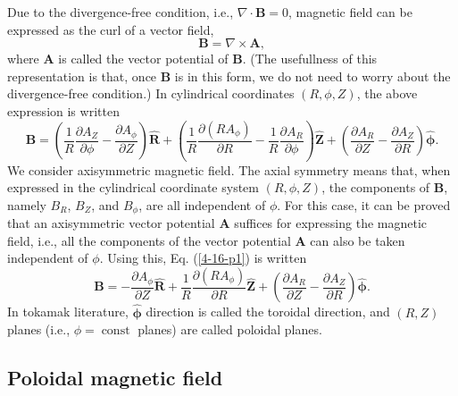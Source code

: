\documentclass{llncs}
\newcommand{\tmmathbf}[1]{\ensuremath{\boldsymbol{#1}}}
\newcommand{\tmop}[1]{\ensuremath{\operatorname{#1}}}
\begin{document}
Due to the divergence-free condition, i.e., $\nabla \cdot \mathbf{B}= 0$,
magnetic field can be expressed as the curl of a vector field,
\begin{equation}
  \mathbf{B}= \nabla \times \mathbf{A},
\end{equation}
where $\mathbf{A}$ is called the vector potential of $\mathbf{B}$. (The
usefullness of this representation is that, once $\mathbf{B}$ is in this form,
we do not need to worry about the divergence-free condition.) In cylindrical
coordinates $(R, \phi, Z)$, the above expression is written
\begin{equation}
  \label{4-16-p1} \mathbf{B}= \left( \frac{1}{R} \frac{\partial A_Z}{\partial
  \phi} - \frac{\partial A_{\phi}}{\partial Z} \right) \hat{\mathbf{R}} +
  \left( \frac{1}{R} \frac{\partial (R A_{\phi})}{\partial R} - \frac{1}{R}
  \frac{\partial A_R}{\partial \phi} \right) \hat{\mathbf{Z}} + \left(
  \frac{\partial A_R}{\partial Z} - \frac{\partial A_Z}{\partial R} \right)
  \hat{\tmmathbf{\phi}} .
\end{equation}
We consider axisymmetric magnetic field. The axial symmetry means that, when
expressed in the cylindrical coordinate system $(R, \phi, Z)$, the components
of $\mathbf{B}$, namely $B_R$, $B_Z$, and $B_{\phi}$, are all independent of
$\phi$. For this case, it can be proved that an axisymmetric vector potential
$\mathbf{A}$ suffices for expressing the magnetic field, i.e., all the
components of the vector potential $\mathbf{A}$ can also be taken independent
of $\phi$. Using this, Eq. (\ref{4-16-p1}) is written
\begin{equation}
  \label{9-6-p1} \mathbf{B}= - \frac{\partial A_{\phi}}{\partial Z}
  \hat{\mathbf{R}} + \frac{1}{R} \frac{\partial (R A_{\phi})}{\partial R}
  \hat{\mathbf{Z}} + \left( \frac{\partial A_R}{\partial Z} - \frac{\partial
  A_Z}{\partial R} \right) \hat{\tmmathbf{\phi}} .
\end{equation}
In tokamak literature, $\hat{\tmmathbf{\phi}}$ direction is called the
toroidal direction, and $(R, Z)$ planes (i.e., $\phi = \tmop{const}$ planes)
are called poloidal planes.

\subsection{Poloidal magnetic field}
\end{document}
